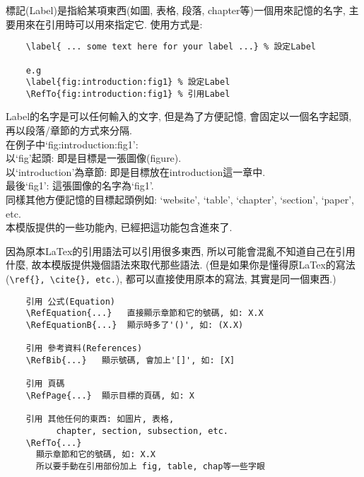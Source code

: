 標記(Label)是指給某項東西(如圖, 表格, 段落, chapter等)一個用來記憶的名字, 主要用來在引用時可以用來指定它. 使用方式是:

  \EmptyLine
  \begin{DescriptionFrame}
  \begin{verbatim}
    \label{ ... some text here for your label ...} % 設定Label

    e.g
    \label{fig:introduction:fig1} % 設定Label
    \RefTo{fig:introduction:fig1} % 引用Label
  \end{verbatim}
  \end{DescriptionFrame}
  \EmptyLine

\noindent Label的名字是可以任何輸入的文字, 但是為了方便記憶, 會固定以一個名字起頭, 再以段落/章節的方式來分隔.\\

\noindent 在例子中`fig:introduction:fig1':\\
以`fig'起頭: 即是目標是一張圖像(figure).\\
以`introduction'為章節: 即是目標放在introduction這一章中.\\
最後`fig1': 這張圖像的名字為`fig1'.\\

\noindent 同樣其他方便記憶的目標起頭例如: `website', `table', `chapter', `section', `paper', etc.\\

\noindent 本模版提供的一些功能內, 已經把這功能包含進來了.

\newpage
{}
因為原本LaTex的引用語法可以引用很多東西, 所以可能會混亂不知道自己在引用什麼, 故本模版提供幾個語法來取代那些語法. (但是如果你是懂得原LaTex的寫法(\verb|\ref{}, \cite{}, etc.|), 都可以直接使用原本的寫法, 其實是同一個東西.)

  \EmptyLine
  \begin{DescriptionFrame}
  \begin{verbatim}
    引用 公式(Equation)
    \RefEquation{...}   直接顯示章節和它的號碼, 如: X.X
    \RefEquationB{...}  顯示時多了'()', 如: (X.X)

    引用 參考資料(References)
    \RefBib{...}   顯示號碼, 會加上'[]', 如: [X]

    引用 頁碼
    \RefPage{...}  顯示目標的頁碼, 如: X

    引用 其他任何的東西: 如圖片, 表格,
          chapter, section, subsection, etc.
    \RefTo{...}
      顯示章節和它的號碼, 如: X.X
      所以要手動在引用部份加上 fig, table, chap等一些字眼
  \end{verbatim}
  \end{DescriptionFrame}

